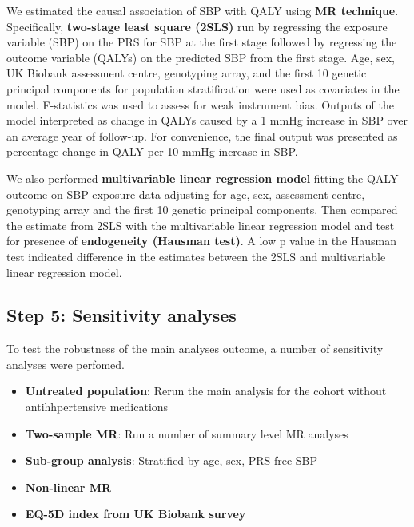 \documentclass[11pt]{article}
\begin{document}
We estimated the causal association of SBP with QALY using \textbf{MR technique}\cite{davey2003mendelian, burgess2015mendelian, lawlor2008mendelian}. Specifically, \textbf{two-stage least square (2SLS)} run by regressing the exposure variable (SBP) on the PRS for SBP at the first stage followed by regressing the outcome variable (QALYs) on the predicted SBP from the first stage. Age, sex, UK Biobank assessment centre, genotyping array, and the first 10 genetic principal components for population stratification were used as covariates in the model. F-statistics was used to assess for weak instrument bias. Outputs of the model interpreted as change in QALYs caused by a 1 mmHg increase in SBP over an average year of follow-up. For convenience, the final output was presented as percentage change in QALY per 10 mmHg increase in SBP.

We also performed \textbf{multivariable linear regression model} fitting the QALY outcome on SBP exposure data adjusting for age, sex, assessment centre, genotyping array and the first 10 genetic principal components. Then compared the estimate from 2SLS with the multivariable linear regression model and test for presence of \textbf{endogeneity (Hausman test)}\cite{durbin1954errors, wu1973alternative, hausman1978specification}. A low p value in the Hausman test indicated difference in the estimates between the 2SLS and multivariable linear regression model. 
\color{violet}
\begin{stlog}\end{stlog}
\color{black}
\newpage
\subsection{Step 5: Sensitivity analyses}

To test the robustness of the main analyses outcome, a number of sensitivity analyses were perfomed. 

\begin{itemize}
	\item \textbf{Untreated population}: Rerun the main analysis for the cohort without antihhpertensive medications 
	\item \textbf{Two-sample MR}: Run a number of summary level MR analyses
	\item \textbf {Sub-group analysis}: Stratified by age, sex, PRS-free SBP
	\item \textbf{Non-linear MR}
	\item \textbf{EQ-5D index from UK Biobank survey}
\end{itemize}
\end{document}
